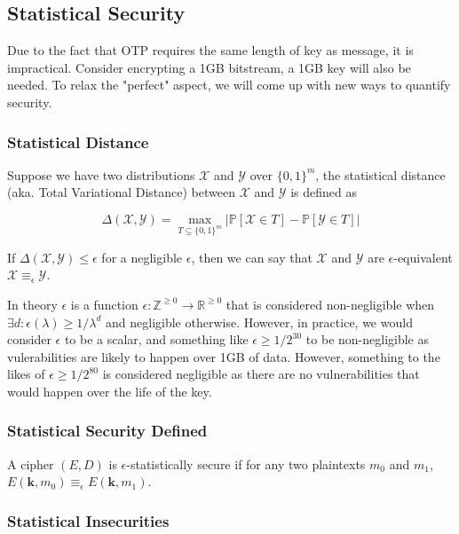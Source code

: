\documentclass{article}
\begin{document}
\begin{multicols}{2}
\subsection {Statistical Security}

Due to the fact that OTP requires the same length of key as message, it is impractical. Consider encrypting a 1GB bitstream, a 1GB key will also be needed. To relax the "perfect" aspect, we will come up with new ways to quantify security.

\subsubsection {Statistical Distance}

Suppose we have two distributions $\mathcal{X}$ and $\mathcal{Y}$ over $\{0,1\}^m$, the statistical distance (aka. Total Variational Distance) between $\mathcal{X}$ and $\mathcal{Y}$ is defined as

$$
\Delta (\mathcal{X}, \mathcal{Y}) = \max_{T \subseteq \{0,1\}^m} |\mathbb{P}[\mathcal{X} \in T] - \mathbb{P}[\mathcal{Y} \in T]|
$$

If $\Delta (\mathcal{X}, \mathcal{Y}) \leq \epsilon$ for a negligible $\epsilon$, then we can say that $\mathcal{X}$ and $\mathcal{Y}$ are $\epsilon$-equivalent $\mathcal{X} \equiv_\epsilon \mathcal{Y}$.

In theory $\epsilon$ is a function $\epsilon : \mathbb{Z}^{\geq 0} \rightarrow \mathbb{R}^{\geq 0}$ that is considered non-negligible when $\exists d : \epsilon(\lambda) \geq 1/\lambda^d$ and negligible otherwise. However, in practice, we would consider $\epsilon$ to be a scalar, and something like $\epsilon \geq 1/2^{30}$ to be non-negligible as vulerabilities are likely to happen over 1GB of data. However, something to the likes of $\epsilon \geq 1/2^{80}$ is considered negligible as there are no vulnerabilities that would happen over the life of the key.

\subsubsection {Statistical Security Defined}

A cipher $(E,D)$ is $\epsilon$-statistically secure if for any two plaintexts $m_0$ and $m_1$, $E(\mathbf{k},m_0) \equiv_\epsilon E(\mathbf{k},m_1)$.

\subsubsection {Statistical Insecurities}


\end{multicols}
\end{document}
